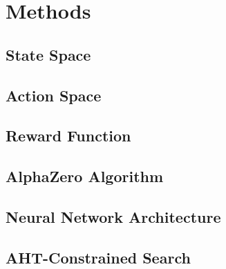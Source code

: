 \chapter{Methods} %



\section{State Space}

\lipsum[1-2]

\section{Action Space}

\lipsum[1-2]

\section{Reward Function}

\lipsum[1-2]

\section{AlphaZero Algorithm}

\lipsum[1-6]

\section{Neural Network Architecture}

\lipsum[1-2]

\section{AHT-Constrained Search}


\lipsum[1-2]



%
%
%
%
%
%
%

